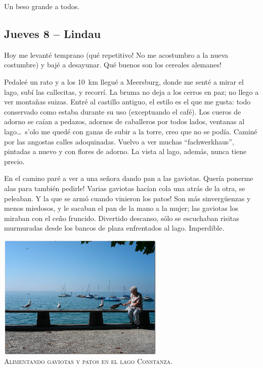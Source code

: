 Un beso grande a todos.

\subsection*{Jueves 8 -- Lindau}

Hoy me levant\'e temprano (\textexclamdown qu\'e repetitivo! No me acostumbro a
la nueva costumbre) y baj\'e a desayunar. \textexclamdown Qu\'e buenos son los
cereales alemanes!

Pedale\'e un rato y a los 10~km llegu\'e a Meersburg, donde me sent\'e
a mirar el lago, sub\'i las callecitas, y recorr\'i. La bruma no deja a los
cerros en paz; no llego a ver monta\~nas suizas. Entr\'e al castillo antiguo,
el estilo es el que me gusta: todo conservado como estaba durante su uso
(exceptuando el caf\'e). Los cueros de adorno se ca\'ian a pedazos, adornos de
caballeros por todos lados, ventanas al lago\ldots\ s'olo me qued\'e con ganas
de subir a la torre, creo que no se pod\'ia. Camin\'e por las angostas calles
adoquinadas. Vuelvo a ver muchas ``fachwerkhaus'', pintadas a nuevo y con
flores de adorno. La vista al lago, adem\'as, nunca tiene precio.

En el camino par\'e a ver a una se\~nora dando pan a las gaviotas.
\textexclamdown Quer\'ia ponerme alas para tambi\'en pedirle! Varias gaviotas
hac\'ian cola una atr\'as de la otra, se peleaban. \textexclamdown Y la que se
arm\'o cuando vinieron los patos! Son m\'as sinverg\"uenzas y menos miedosos, y
le sacaban el pan de la mano a la mujer; las gaviotas los miraban con el ce\~no
fruncido. Divertido descanso, s\'olo se escuchaban risitas murmuradas desde los
bancos de plaza enfrentados al lago. Imperdible.

\begin{center} \includegraphics[width=300px]{images/DSC01957.JPG}\\
\textsc{Alimentando gaviotas y patos en el lago Constanza.} \end{center}

